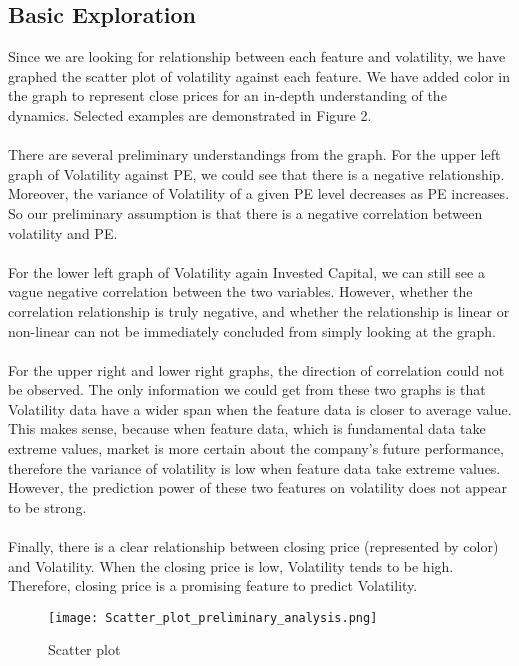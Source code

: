 \documentclass[a4paper]{article}
\begin{document}
\subsection{Basic Exploration}
Since we are looking for relationship between each feature and volatility, we have graphed the scatter plot of volatility against each feature. We have added color in the graph to represent close prices for an in-depth understanding of the dynamics. Selected examples are demonstrated in Figure 2.
\\\\There are several preliminary understandings from the graph. For the upper left graph of Volatility against PE, we could see that there is a negative relationship. Moreover, the variance of Volatility of a given PE level decreases as PE increases. So our preliminary assumption is that there is a negative correlation between volatility and PE. 
\\\\For the lower left graph of Volatility again Invested Capital, we can still see a vague negative correlation between the two variables. However, whether the correlation relationship is truly negative, and whether the relationship is linear or non-linear can not be immediately concluded from simply looking at the graph.
\\\\For the upper right and lower right graphs, the direction of correlation could not be observed. The only information we could get from these two graphs is that Volatility data have a wider span when the feature data is closer to average value. This makes sense, because when feature data, which is fundamental data take extreme values, market is more certain about the company's future performance, therefore the variance of volatility is low when feature data take extreme values. However, the prediction power of these two features on volatility does not appear to be strong.
\\\\Finally, there is a clear relationship between closing price (represented by color) and Volatility. When the closing price is low, Volatility tends to be high. Therefore, closing price is a promising feature to predict Volatility.

\begin{figure}
\centering
\texttt{[image: Scatter\_plot\_preliminary\_analysis.png]}
\caption{\label{fig:scatter plot}Scatter plot}
\end{figure}
\end{document}
